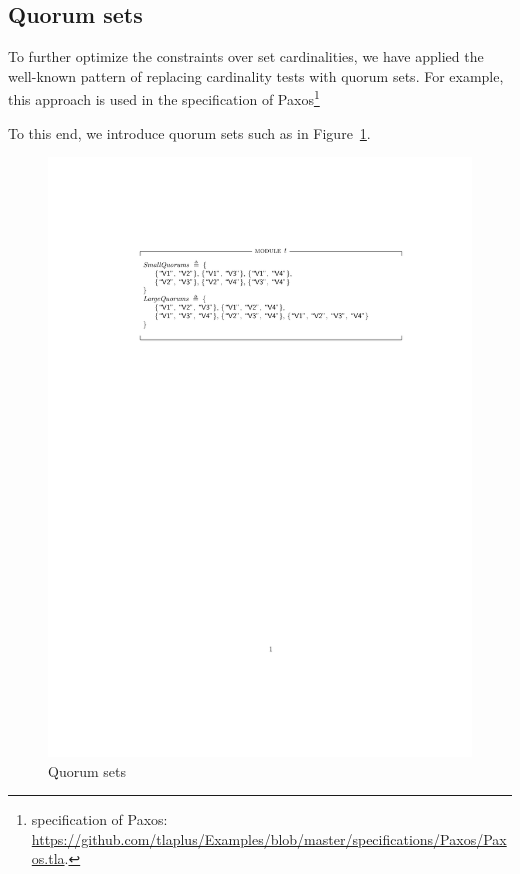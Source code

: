 \subsection{Quorum sets}

To further optimize the constraints over set cardinalities, we have applied the
well-known pattern of replacing cardinality tests with quorum sets. For
example, this approach is used in the specification of Paxos\footnote{%
    \tlap{} specification of Paxos:
\url{https://github.com/tlaplus/Examples/blob/master/specifications/Paxos/Paxos.tla}.}

To this end, we introduce quorum sets such as in Figure~\ref{fig:quorum-sets}.

\begin{figure}[!h]
    \includegraphics[width=\textwidth]{images/quorum-sets}
    \caption{Quorum sets}\label{fig:quorum-sets}
\end{figure}

